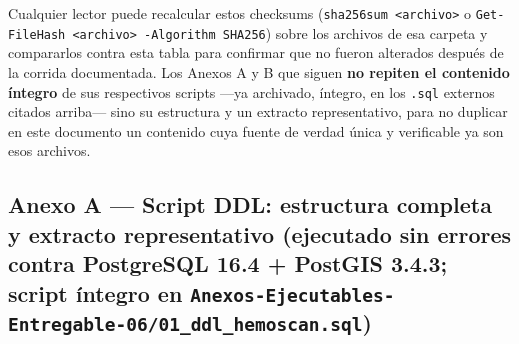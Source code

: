 \documentclass[11pt,a4paper]{article}
\begin{document}
Cualquier lector puede recalcular estos checksums (\texttt{sha256sum\ \textless{}archivo\textgreater{}} o \texttt{Get-FileHash\ \textless{}archivo\textgreater{}\ -Algorithm\ SHA256}) sobre los archivos de esa carpeta y compararlos contra esta tabla para confirmar que no fueron alterados después de la corrida documentada. Los Anexos A y B que siguen \textbf{no repiten el contenido íntegro} de sus respectivos scripts ---ya archivado, íntegro, en los \texttt{.sql} externos citados arriba--- sino su estructura y un extracto representativo, para no duplicar en este documento un contenido cuya fuente de verdad única y verificable ya son esos archivos.

\subsection{\texorpdfstring{Anexo A --- Script DDL: estructura completa y extracto representativo (ejecutado sin errores contra PostgreSQL 16.4 + PostGIS 3.4.3; script íntegro en \texttt{Anexos-Ejecutables-Entregable-06/01\_ddl\_hemoscan.sql})}{Anexo A --- Script DDL: estructura completa y extracto representativo (ejecutado sin errores contra PostgreSQL 16.4 + PostGIS 3.4.3; script íntegro en Anexos-Ejecutables-Entregable-06/01\_ddl\_hemoscan.sql)}}\label{anexo-a-script-ddl-estructura-completa-y-extracto-representativo-ejecutado-sin-errores-contra-postgresql-16.4-postgis-3.4.3-script-uxedntegro-en-anexos-ejecutables-entregable-0601_ddl_hemoscan.sql}
\end{document}
